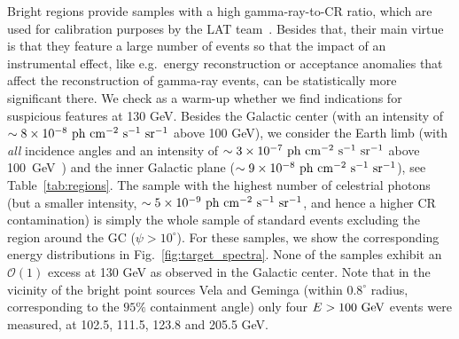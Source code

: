 \documentclass[aps,twocolumn,prd,superscriptaddress,showpacs,nofootinbib,fixfloat]{revtex4}
\newcommand{\s}{{\rm ~s}}
\newcommand{\cm}{{\rm ~cm}}
\newcommand{\ph}{{\rm ~ph}}
\newcommand{\sr}{{\rm ~sr}}
\newcommand{\GeV}{{\rm ~GeV}}
\begin{document}
Bright regions provide samples with a high gamma-ray-to-CR ratio,
which are used for calibration purposes by the LAT team~\cite{collaboration:2012kca}.
Besides that, their main virtue is that they feature a large number of events so
that the impact of an instrumental effect, like e.g.~energy
reconstruction or acceptance anomalies that affect the reconstruction of
gamma-ray events, can be statistically more
significant there. 
We check as a warm-up whether we find indications for
suspicious features at 130 GeV.
Besides the Galactic center (with an intensity of $\sim 8\times10^{-8}
\ph\cm^{-2}\s^{-1}\sr^{-1}$ above 100 GeV), we consider the
Earth limb (with \emph{all} incidence angles and an intensity of $\sim3\times10^{-7}
\ph \cm^{-2}\s^{-1}\sr^{-1}$ above 100~GeV~\cite{FermiLimb}) and the inner
Galactic plane
($\sim9\times10^{-8}\ph\cm^{-2}\s^{-1}\sr^{-1}$), see
Table~\ref{tab:regions}. 
The sample with the highest number of celestrial photons 
(but a smaller intensity, $\sim5\times10^{-9}\ph\cm^{-2}\s^{-1}\sr^{-1}$, and hence
a higher CR contamination) is
simply the whole sample of
standard events excluding the region around the GC
($\psi>10^\circ$).
For these samples, we show the corresponding energy
distributions in Fig.~\ref{fig:target_spectra}. None of the
samples exhibit an $\mathcal{O}(1)$ excess at 130 GeV as
observed in the Galactic center. Note that in the vicinity
of the bright point sources Vela and Geminga (within
$0.8^\circ$ radius, corresponding to the $95\%$ containment angle) 
only four $E>100\GeV$ events were measured, at
102.5, 111.5, 123.8 and 205.5 GeV.
\medskip
\end{document}
